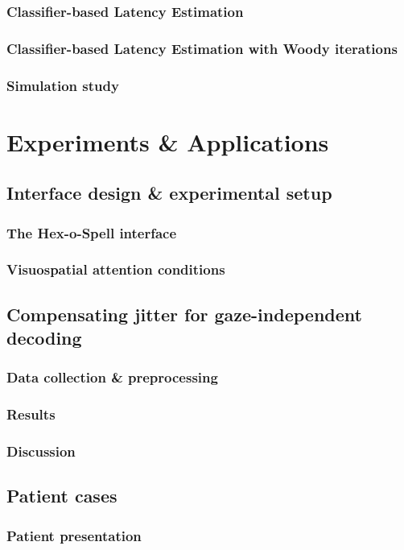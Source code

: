 \section{Classifier-based Latency Estimation}
\section{Classifier-based Latency Estimation with Woody iterations}
\section{Simulation study}

\part{Experiments \& Applications}

\chapter{Interface design \& experimental setup}
\section{The Hex-o-Spell interface}
\section{Visuospatial attention conditions}

\chapter{Compensating jitter for gaze-independent decoding}
\section{Data collection \& preprocessing}
\section{Results}
\section{Discussion}

\chapter{Patient cases}
\section{Patient presentation}
